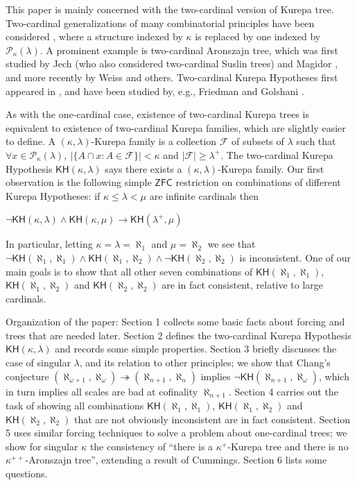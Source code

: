 \documentclass[10pt,reqno]{amsart}
\theoremstyle{plain}
\theoremstyle{definition}
\theoremstyle{remark}
\begin{document}
This paper is mainly concerned with the two-cardinal version of Kurepa tree. Two-cardinal generalizations of many combinatorial principles have been considered \cite{donder-matet1993,shelah-shioya2006,cody-white2024}, where a structure indexed by $\kappa$ is replaced by one indexed by $\mathcal{P}_\kappa(\lambda)$. A prominent example is two-cardinal Aronszajn tree, which was first studied by Jech \cite{jech1973mess} (who also considered two-cardinal Suslin trees) and Magidor \cite{magidor1974}, and more recently by Weiss \cite{weiss2010subtle} and others. Two-cardinal Kurepa Hypotheses first appeared in \cite{Jensen-Kunen}, and have been studied by, e.g., Friedman and Golshani \cite{friedman-golshani2012independence}.

As with the one-cardinal case, existence of two-cardinal Kurepa trees is equivalent to existence of two-cardinal Kurepa families, which are slightly easier to define. A $(\kappa,\lambda)$-Kurepa family is a collection $\mathcal{F}$ of subsets of $\lambda$ such that $\forall x\in\mathcal{P}_\kappa(\lambda),\ |\{A\cap x:A\in\mathcal{F}\}|<\kappa$ and $|\mathcal{F}|\geq\lambda^+$. The two-cardinal Kurepa Hypothesis $\mathsf{KH}(\kappa,\lambda)$ says there exists a $(\kappa,\lambda)$-Kurepa family. Our first observation is the following simple $\mathsf{ZFC}$ restriction on combinations of different Kurepa Hypotheses: if $\kappa\leq\lambda<\mu$ are infinite cardinals then

\begin{center}
$\lnot\mathsf{KH}(\kappa,\lambda)\land\mathsf{KH}(\kappa,\mu)\rightarrow\mathsf{KH}(\lambda^+,\mu)$
\end{center}

In particular, letting $\kappa=\lambda=\aleph_1$ and $\mu=\aleph_2$ we see that $\lnot\mathsf{KH}(\aleph_1,\aleph_1)\land\mathsf{KH}(\aleph_1,\aleph_2)\land\lnot\mathsf{KH}(\aleph_2,\aleph_2)$ is inconsistent. One of our main goals is to show that all other seven combinations of $\mathsf{KH}(\aleph_1,\aleph_1)$, $\mathsf{KH}(\aleph_1,\aleph_2)$ and $\mathsf{KH}(\aleph_2,\aleph_2)$ are in fact consistent, relative to large cardinals.

Organization of the paper: Section 1 collects some basic facts about forcing and trees that are needed later. Section 2 defines the two-cardinal Kurepa Hypothesis $\mathsf{KH}(\kappa,\lambda)$ and records some simple properties. Section 3 briefly discusses the case of singular $\lambda$, and its relation to other principles; we show that Chang's conjecture $(\aleph_{\omega+1},\aleph_\omega)\twoheadrightarrow(\aleph_{n+1},\aleph_n)$ implies $\lnot\mathsf{KH}(\aleph_{n+1},\aleph_\omega)$, which in turn implies all scales are bad at cofinality $\aleph_{n+1}$. Section 4 carries out the task of showing all combinations $\mathsf{KH}(\aleph_1,\aleph_1)$, $\mathsf{KH}(\aleph_1,\aleph_2)$ and $\mathsf{KH}(\aleph_2,\aleph_2)$ that are not obviously inconsistent are in fact consistent. Section 5 uses similar forcing techniques to solve a problem about one-cardinal trees; we show for singular $\kappa$ the consistency of ``there is a $\kappa^+$-Kurepa tree and there is no $\kappa^{++}$-Aronszajn tree'', extending a result of Cummings. Section 6 lists some questions.
\end{document}
